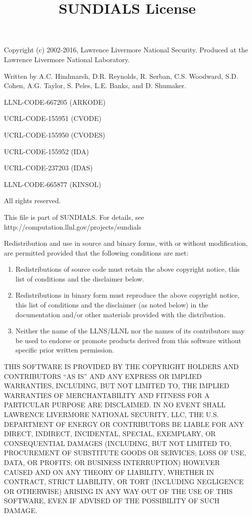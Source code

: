 \documentclass[a4paper, 12pt]{article}
\begin{document}
\title{SUNDIALS License}
\date{}

\maketitle
Copyright (c) 2002-2016, Lawrence Livermore National Security.
Produced at the Lawrence Livermore National Laboratory.

Written by A.C. Hindmarsh, D.R. Reynolds, R. Serban, C.S. Woodward, S.D. Cohen, A.G. Taylor, S. Peles, L.E. Banks, and D. Shumaker.

LLNL-CODE-667205    (ARKODE)

UCRL-CODE-155951    (CVODE)

UCRL-CODE-155950    (CVODES)

UCRL-CODE-155952    (IDA)

UCRL-CODE-237203    (IDAS)

LLNL-CODE-665877    (KINSOL)

All rights reserved.

\vspace{0.5cm}

This file is part of SUNDIALS.  For details, see http://computation.llnl.gov/projects/sundials

Redistribution and use in source and binary forms, with or without modification, are permitted provided that the following conditions are met:

\begin{enumerate}
\item Redistributions of source code must retain the above copyright notice, this list of conditions and the disclaimer below.
\item Redistributions in binary form must reproduce the above copyright notice, this list of conditions and the disclaimer (as noted below) in the documentation and/or other materials provided with the distribution.
\item Neither the name of the LLNS/LLNL nor the names of its contributors may be used to endorse or promote products derived from this software without specific prior written permission.
\end{enumerate}

THIS SOFTWARE IS PROVIDED BY THE COPYRIGHT HOLDERS AND CONTRIBUTORS ``AS IS'' AND ANY EXPRESS OR IMPLIED WARRANTIES, INCLUDING, BUT NOT LIMITED TO, THE IMPLIED WARRANTIES OF MERCHANTABILITY AND FITNESS FOR A PARTICULAR PURPOSE ARE DISCLAIMED. IN NO EVENT SHALL LAWRENCE LIVERMORE NATIONAL SECURITY, LLC, THE U.S. DEPARTMENT OF ENERGY OR CONTRIBUTORS BE LIABLE FOR ANY DIRECT, INDIRECT, INCIDENTAL, SPECIAL, EXEMPLARY, OR CONSEQUENTIAL DAMAGES (INCLUDING, BUT NOT LIMITED TO, PROCUREMENT OF SUBSTITUTE GOODS OR SERVICES; LOSS OF USE, DATA, OR PROFITS; OR BUSINESS INTERRUPTION) HOWEVER CAUSED AND ON ANY THEORY OF LIABILITY, WHETHER IN CONTRACT, STRICT LIABILITY, OR TORT (INCLUDING NEGLIGENCE OR OTHERWISE) ARISING IN ANY WAY OUT OF THE USE OF THIS SOFTWARE, EVEN IF ADVISED OF THE POSSIBILITY OF SUCH DAMAGE.
\end{document}
